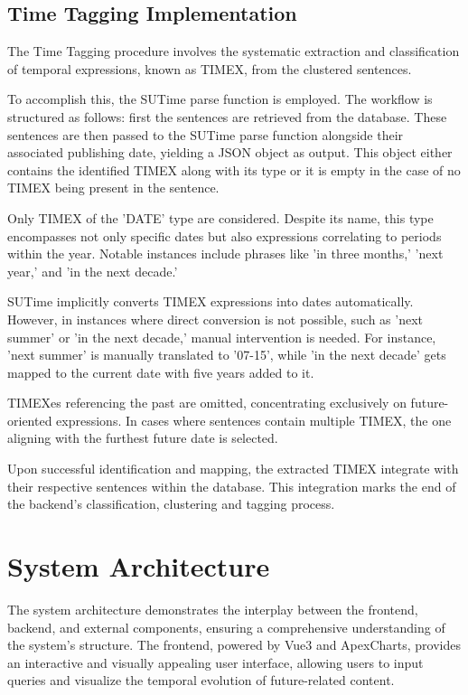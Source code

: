 \documentclass[a4paper,10pt]{report} %
\begin{document}
\subsection{Time Tagging Implementation}
The Time Tagging procedure involves the systematic extraction and classification of temporal expressions, known as TIMEX, from the clustered sentences.

To accomplish this, the SUTime parse function is employed. The workflow is structured as follows: first the sentences are retrieved from the database. These sentences are then passed to the SUTime parse function alongside their associated publishing date, yielding a JSON object as output. This object either contains the identified TIMEX along with its type or it is empty in the case of no TIMEX being present in the sentence.

Only TIMEX of the 'DATE' type are considered. Despite its name, this type encompasses not only specific dates but also expressions correlating to periods within the year. Notable instances include phrases like 'in three months,' 'next year,' and 'in the next decade.'

SUTime implicitly converts TIMEX expressions into dates automatically. However, in instances where direct conversion is not possible, such as 'next summer' or 'in the next decade,' manual intervention is needed. For instance, 'next summer' is manually translated to '07-15', while 'in the next decade' gets mapped to the current date with five years added to it.

TIMEXes referencing the past are omitted, concentrating exclusively on future-oriented expressions. In cases where sentences contain multiple TIMEX, the one aligning with the furthest future date is selected.

Upon successful identification and mapping, the extracted TIMEX integrate with their respective sentences within the database. This integration marks the end of the backend's classification, clustering and tagging process.

\section{System Architecture}
The system architecture demonstrates the interplay between the frontend, backend, and external components, ensuring a comprehensive understanding of the system's structure. The frontend, powered by Vue3 and ApexCharts, provides an interactive and visually appealing user interface, allowing users to input queries and visualize the temporal evolution of future-related content.
\end{document}
